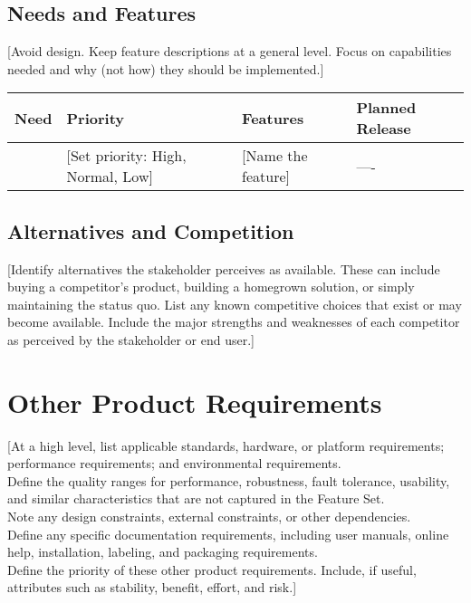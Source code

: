 \documentclass[11pt, a4paper]{supplemental-document}
\begin{document}
\subsection{Needs and Features}

[Avoid design. Keep feature descriptions at a general level. Focus on capabilities needed and why (not how) they should be implemented.]\\

\begin{table}[H]
\centering
\begin{tabular}{||p{3cm}||p{2cm}||p{2cm}||p{4cm}||}
\hline

Need & Priority & Features & Planned Release\\
\hline
[state a need]	 & {[Set priority:
High, Normal, Low] } & {[Name the feature]	 } & {---- }\\
\hline

\end{tabular}
\label{tab:problem statement}
 \end{table}
\subsection{Alternatives and Competition}
	
[Identify alternatives the stakeholder perceives as available. These can include buying a competitor’s product, building a homegrown solution, or simply maintaining the status quo. List any known competitive choices that exist or may become available. Include the major strengths and weaknesses of each competitor as perceived by the stakeholder or end user.]\\

\section{Other Product Requirements}
[At a high level, list applicable standards, hardware, or platform requirements; performance requirements; and environmental requirements.\\
Define the quality ranges for performance, robustness, fault tolerance, usability, and similar characteristics that are not captured in the Feature Set.\\
Note any design constraints, external constraints, or other dependencies.\\
Define any specific documentation requirements, including user manuals, online help, installation, labeling, and packaging requirements.\\
Define the priority of these other product requirements. Include, if useful, attributes such as stability, benefit, effort, and risk.]\\
\end{document}
